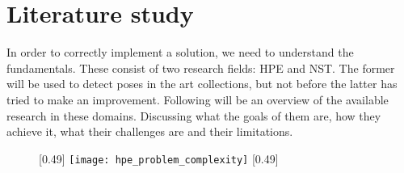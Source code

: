 \graphicspath{{images/chapter1/}}

\chapter{Literature study}
\label{chap:rel_work}
In order to correctly implement a solution, we need to understand the fundamentals.
These consist of two research fields: \gls{HPE} and \gls{NST}.
The former will be used to detect poses in the art collections, but not before the latter has tried to make an improvement.
Following will be an overview of the available research in these domains.
Discussing what the goals of them are, how they achieve it, what their challenges are and their limitations.

\begin{figure}
	\centering
	[0.49\textwidth]{
		\texttt{[image: hpe\_problem\_complexity]}
		\label{fig:hpe_problem_complexity}
	}
	[0.49\textwidth]{
		\label{fig:pose_representation}
	}
\end{figure}

